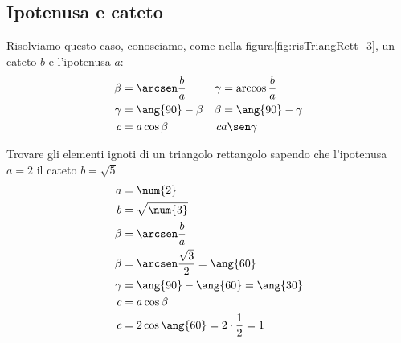 \subsection{Ipotenusa e cateto}
Risolviamo questo caso, conosciamo, come nella figura\nobs\vref*{fig:risTriangRett_3}, un cateto $b$ e l'ipotenusa $a$:
\begin{align*}
\beta&=\arcsen\dfrac{b}{a}&\gamma&=\arccos\dfrac{b}{a}\\
\gamma&=\ang{90}-\beta&\beta&=\ang{90}-\gamma\\
c&=a\cos\beta&c&a\sen\gamma
\end{align*}
\begin{esempio}
Trovare gli elementi ignoti di un triangolo rettangolo sapendo che l'ipotenusa $a=2$  il cateto $b=\sqrt{5}$
\begin{align*}
a&=\num{2}\\
b&=\sqrt{\num{3}}\\
\beta&=\arcsen\dfrac{b}{a}\\
\beta&=\arcsen\dfrac{\sqrt{3}}{2}=\ang{60}\\
\gamma&=\ang{90}-\ang{60}=\ang{30}\\
c&=a\cos\beta\\
c&=2\cos\ang{60}=2\cdot\dfrac{1}{2}=1
\end{align*} 
\end{esempio}
